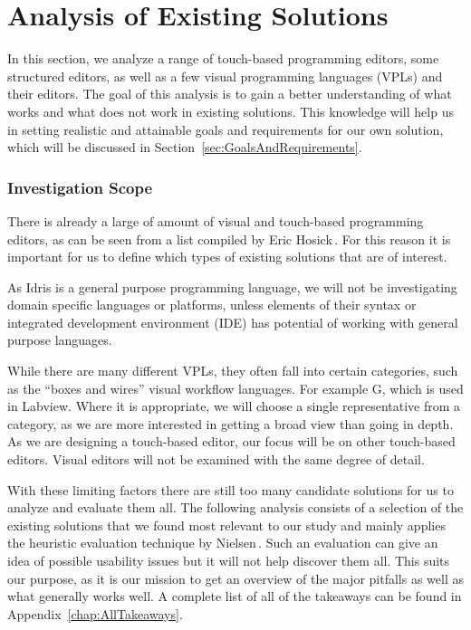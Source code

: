 \chapter{Analysis of Existing Solutions}
\label{sec:Analysis}
In this section, we analyze a range of touch-based programming editors, some structured editors, as well as a few visual programming languages (VPLs) and their editors.
The goal of this analysis is to gain a better understanding of what works and what does not work in existing solutions.
This knowledge will help us in setting realistic and attainable goals and requirements for our own solution, which will be discussed in Section~\ref{sec:GoalsAndRequirements}.

\subsection{Investigation Scope}
There is already a large of amount of visual and touch-based programming editors, as can be seen from a list compiled by Eric Hosick\,\cite{hosick2014}.
For this reason it is important for us to define which types of existing solutions that are of interest.

As Idris is a general purpose programming language, we will not be investigating domain specific languages or platforms, unless elements of their syntax or integrated development environment (IDE) has potential of working with general purpose languages.

While there are many different VPLs, they often fall into certain categories, such as the ``boxes and wires'' visual workflow languages. For example G, which is used in Labview.
Where it is appropriate, we will choose a single representative from a category, as we are more interested in getting a broad view than going in depth.
As we are designing a touch-based editor, our focus will be on other touch-based editors. Visual editors will not be examined with the same degree of detail.

With these limiting factors there are still too many candidate solutions for us to analyze and evaluate them all. 
The following analysis consists of a selection of the existing solutions that we found most relevant to our study and mainly applies the heuristic evaluation technique by Nielsen\,\cite{nielsen1990heuristic}. 
Such an evaluation can give an idea of possible usability issues but it will not help discover them all. 
This suits our purpose, as it is our mission to get an overview of the major pitfalls as well as what generally works well.
A complete list of all of the takeaways can be found in
Appendix~\ref{chap:AllTakeaways}.

